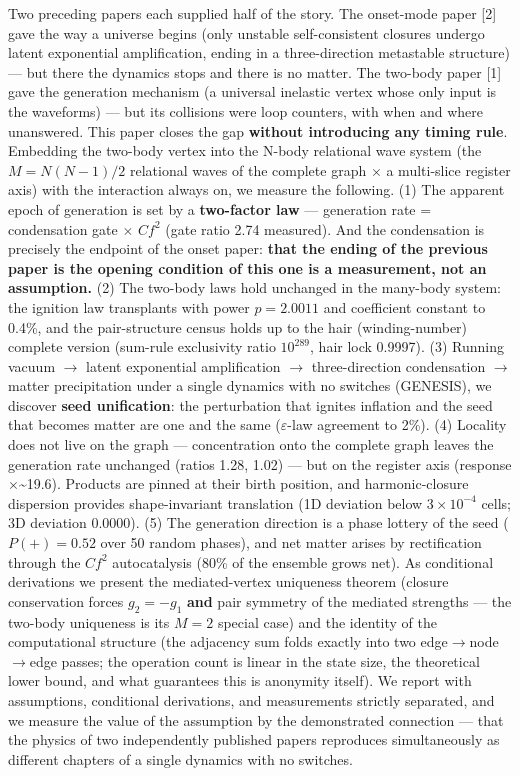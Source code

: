 \documentclass[
  a4paper,
]{article}
\begin{document}
Two preceding papers each supplied half of the story. The onset-mode
paper {[}2{]} gave the way a universe begins (only unstable
self-consistent closures undergo latent exponential amplification,
ending in a three-direction metastable structure) --- but there the
dynamics stops and there is no matter. The two-body paper {[}1{]} gave
the generation mechanism (a universal inelastic vertex whose only input
is the waveforms) --- but its collisions were loop counters, with when
and where unanswered. This paper closes the gap \textbf{without
introducing any timing rule}. Embedding the two-body vertex into the
N-body relational wave system (the \(M=N(N-1)/2\) relational waves of
the complete graph \(\times\) a multi-slice register axis) with the
interaction always on, we measure the following. (1) The apparent epoch
of generation is set by a \textbf{two-factor law} --- generation rate =
condensation gate \(\times\) \(Cf^2\) (gate ratio 2.74 measured). And
the condensation is precisely the endpoint of the onset paper:
\textbf{that the ending of the previous paper is the opening condition
of this one is a measurement, not an assumption.} (2) The two-body laws
hold unchanged in the many-body system: the ignition law transplants
with power \(p=2.0011\) and coefficient constant to 0.4\%, and the
pair-structure census holds up to the hair (winding-number) complete
version (sum-rule exclusivity ratio \(10^{289}\), hair lock 0.9997). (3)
Running vacuum \(\to\) latent exponential amplification \(\to\)
three-direction condensation \(\to\) matter precipitation under a single
dynamics with no switches (GENESIS), we discover \textbf{seed
unification}: the perturbation that ignites inflation and the seed that
becomes matter are one and the same (\(\varepsilon\)-law agreement to
2\%). (4) Locality does not live on the graph --- concentration onto the
complete graph leaves the generation rate unchanged (ratios 1.28, 1.02)
--- but on the register axis (response \(\times\)\textasciitilde19.6).
Products are pinned at their birth position, and harmonic-closure
dispersion provides shape-invariant translation (1D deviation below
\(3\times10^{-4}\) cells; 3D deviation 0.0000). (5) The generation
direction is a phase lottery of the seed (\(P(+)=0.52\) over 50 random
phases), and net matter arises by rectification through the \(Cf^2\)
autocatalysis (80\% of the ensemble grows net). As conditional
derivations we present the mediated-vertex uniqueness theorem (closure
conservation forces \(g_2=-g_1\) \textbf{and} pair symmetry of the
mediated strengths --- the two-body uniqueness is its \(M=2\) special
case) and the identity of the computational structure (the adjacency sum
folds exactly into two edge\(\to\)node\(\to\)edge passes; the operation
count is linear in the state size, the theoretical lower bound, and what
guarantees this is anonymity itself). We report with assumptions,
conditional derivations, and measurements strictly separated, and we
measure the value of the assumption by the demonstrated connection ---
that the physics of two independently published papers reproduces
simultaneously as different chapters of a single dynamics with no
switches.
\end{document}
